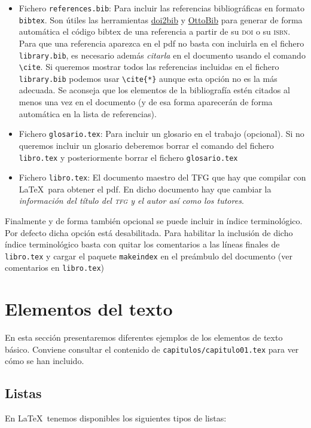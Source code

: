 \begin{itemize}
  \item Fichero \texttt{references.bib}: Para incluir las referencias bibliográficas en formato \texttt{bibtex}. Son útiles las herramientas \href{https://www.doi2bib.org/}{doi2bib} y \href{https://www.ottobib.com/}{OttoBib} para generar de forma automática el código bibtex de una referencia a partir de su \textsc{doi} o su \textsc{isbn}. Para que una referencia aparezca en el pdf no basta con incluirla en el fichero \texttt{library.bib}, es necesario además \emph{citarla} en el documento usando el comando \verb+\cite+. Si queremos mostrar todos las referencias incluidas en el fichero \texttt{library.bib} podemos usar \verb+\cite{*}+ aunque esta opción no es la más adecuada. Se aconseja que los elementos de la bibliografía estén citados al menos una vez en el documento (y de esa forma aparecerán de forma automática en la lista de referencias).

  \item Fichero \texttt{glosario.tex}: Para incluir un glosario en el trabajo (opcional). Si no queremos incluir un glosario deberemos borrar el comando \verb++ del fichero \texttt{libro.tex} y posteriormente borrar el fichero \texttt{glosario.tex}

   \item Fichero \texttt{libro.tex}: El documento maestro del TFG que hay que compilar con \LaTeX\ para obtener el pdf. En dicho documento hay que cambiar la \emph{información del título del \textsc{tfg} y el autor así como los tutores}.
\end{itemize}

Finalmente y de forma también opcional se puede incluir in índice terminológico. Por defecto dicha opción está desabilitada. Para habilitar la inclusión de dicho índice terminológico basta con quitar los comentarios a las líneas finales de \texttt{libro.tex} y cargar el paquete \texttt{makeindex} en el preámbulo del documento (ver comentarios en \texttt{libro.tex})


\section{Elementos del texto}

En esta sección presentaremos diferentes ejemplos de los elementos de texto básico. Conviene consultar el contenido de \texttt{capitulos/capitulo01.tex} para ver cómo se han incluido.

\subsection{Listas}
En \LaTeX\ tenemos disponibles los siguientes tipos de listas:

